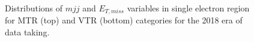 \begin{figure}[htbp]
{    }
  \caption{Distributions of $mjj$ and $E_{T,miss}$ variables in single electron region for MTR (top) and VTR (bottom) categories for the 2018 era of data taking.}
  \label{fig:2018_Wenu_1}
\end{figure}


